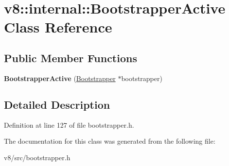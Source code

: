\hypertarget{classv8_1_1internal_1_1BootstrapperActive}{}\section{v8\+:\+:internal\+:\+:Bootstrapper\+Active Class Reference}
\label{classv8_1_1internal_1_1BootstrapperActive}
\subsection*{Public Member Functions}
\begin{DoxyCompactItemize}
\item 
\mbox{\label{classv8_1_1internal_1_1BootstrapperActive_a2a63a90c8aa5a3b8bfddb86194f33daf}} 
{\bfseries Bootstrapper\+Active} (\mbox{\hyperlink{classv8_1_1internal_1_1Bootstrapper}{Bootstrapper}} $\ast$bootstrapper)
\end{DoxyCompactItemize}


\subsection{Detailed Description}


Definition at line 127 of file bootstrapper.\+h.



The documentation for this class was generated from the following file\+:\begin{DoxyCompactItemize}
\item 
v8/src/bootstrapper.\+h\end{DoxyCompactItemize}
